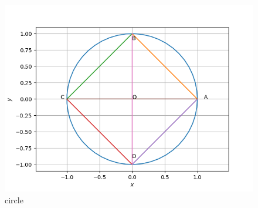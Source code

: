 \documentclass[journal,12pt,twocolumn]{IEEEtran}
\begin{document}
\begin{figure}[!htb]
    \centering
    \includegraphics[width=\columnwidth]{chapters/9/10/6/7/figs/circle.png}
    \caption{circle}
    \label{fig:chapters/9/10/6/7/circle}
\end{figure}
\end{document}
